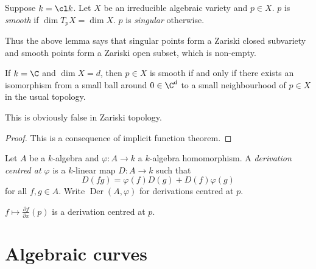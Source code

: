 \documentclass[a4paper]{article}
\DeclareMathOperator{\Der}{Der} %
\begin{document}
\begin{definition}
  Suppose \(k = \cl k\). Let \(X\) be an irreducible algebraic variety and \(p \in X\). \(p\) is \emph{smooth} if \(\dim T_pX = \dim X\). \(p\) is \emph{singular} otherwise.
\end{definition}

Thus the above lemma says that singular points form a Zariski closed subvariety and smooth points form a Zariski open subset, which is non-empty.

\begin{proposition}[nonexaminable]
  If \(k = \C\) and \(\dim X = d\), then \(p \in X\) is smooth if and only if there exists an isomorphism from a small ball around \(0 \in \C^d\) to a small neighbourhood of \(p \in X\) in the usual topology.
\end{proposition}

This is obviously false in Zariski topology.

\begin{proof}
  This is a consequence of implicit function theorem.
\end{proof}

\begin{definition}[derivation]
  Let \(A\) be a \(k\)-algebra and \(\varphi: A \to k\) a \(k\)-algebra homomorphism. A \emph{derivation centred at \(\varphi\)} is a \(k\)-linear map \(D: A \to k\) such that
  \[
    D(fg) = \varphi(f) D(g) + D(f) \varphi(g)
  \]
  for all \(f, g \in A\). Write \(\Der(A, \varphi)\) for derivations centred at \(p\).
\end{definition}

\begin{eg}
  \(f \mapsto \frac{\partial f}{\partial x}(p)\) is a derivation centred at \(p\).
\end{eg}






















\iffalse

\section{Algebraic curves}
\end{document}
